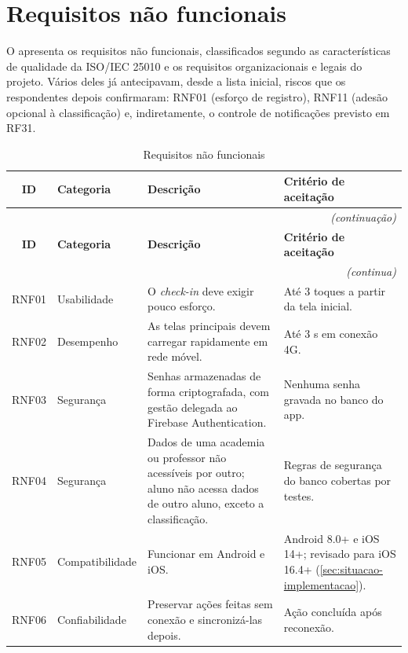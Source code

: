 \section{Requisitos não funcionais}
\label{sec:rnf}

O  apresenta os requisitos não funcionais, classificados
segundo as características de qualidade da ISO/IEC 25010 e os requisitos
organizacionais e legais do projeto. Vários deles já antecipavam, desde a
lista inicial, riscos que os respondentes depois confirmaram: RNF01
(esforço de registro), RNF11 (adesão opcional à classificação) e,
indiretamente, o controle de notificações previsto em RF31.

\begin{quadrolongo}
\begin{longtable}{|c|p{2.3cm}|p{7.0cm}|p{3.6cm}|}
  \caption{Requisitos não funcionais}\label{qua:rnf}\\
  \hline
  \textbf{ID} & \textbf{Categoria} & \textbf{Descrição} & \textbf{Critério de aceitação} \\ \hline
\endfirsthead
  \multicolumn{4}{r}{\textit{(continuação)}}\\
  \hline
  \textbf{ID} & \textbf{Categoria} & \textbf{Descrição} & \textbf{Critério de aceitação} \\ \hline
\endhead
  \multicolumn{4}{r}{\textit{(continua)}}\\
\endfoot
\endlastfoot
    RNF01 & Usabilidade & O \textit{check-in} deve exigir pouco esforço. & Até 3 toques a partir da tela inicial. \\ \hline
    RNF02 & Desempenho & As telas principais devem carregar rapidamente em rede móvel. & Até 3 s em conexão 4G. \\ \hline
    RNF03 & Segurança & Senhas armazenadas de forma criptografada, com gestão delegada ao Firebase Authentication. & Nenhuma senha gravada no banco do app. \\ \hline
    RNF04 & Segurança & Dados de uma academia ou professor não acessíveis por outro; aluno não acessa dados de outro aluno, exceto a classificação. & Regras de segurança do banco cobertas por testes. \\ \hline
    RNF05 & Compatibilidade & Funcionar em Android e iOS. & Android 8.0+ e iOS 14+; revisado para iOS 16.4+ (\autoref{sec:situacao-implementacao}). \\ \hline
    RNF06 & Confiabilidade & Preservar ações feitas sem conexão e sincronizá-las depois. & Ação concluída após reconexão. \\ \hline

\end{longtable}
\end{quadrolongo}
